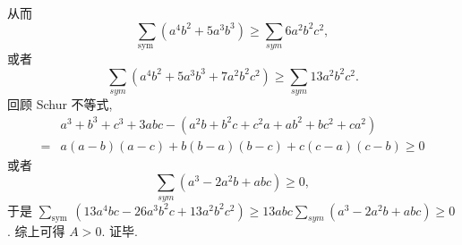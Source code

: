 从而
$$
\sum_{\text {sym }}\left(a^4 b^2+5 a^3 b^3\right) \geqslant \sum_{s y m} 6 a^2 b^2 c^2,
$$
或者
$$
\sum_{s y m}\left(a^4 b^2+5 a^3 b^3+7 a^2 b^2 c^2\right) \geqslant \sum_{s y m} 13 a^2 b^2 c^2 .
$$
回顾 Schur 不等式,
$$
\begin{aligned}
& a^3+b^3+c^3+3 a b c-\left(a^2 b+b^2 c+c^2 a+a b^2+b c^2+c a^2\right) \\
= & a(a-b)(a-c)+b(b-a)(b-c)+c(c-a)(c-b) \geqslant 0
\end{aligned}
$$
或者
$$
\sum_{s y m}\left(a^3-2 a^2 b+a b c\right) \geqslant 0,
$$
于是 $\sum_{\text {sym }}\left(13 a^4 b c-26 a^3 b^2 c+13 a^2 b^2 c^2\right) \geqslant 13 a b c \sum_{s y m}\left(a^3-2 a^2 b+a b c\right) \geqslant 0$.
综上可得 $A>0$. 证毕.



